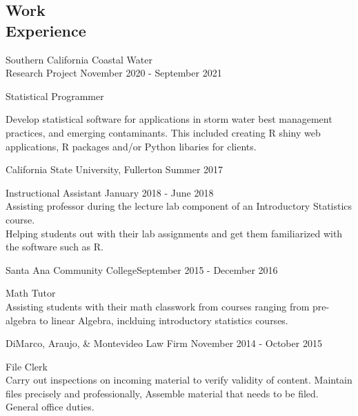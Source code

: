 \documentclass[margin,line]{res}
\newenvironment{list1}{
  \begin{list}{\ding{113}}{
      \setlength{\itemsep}{0in}
      \setlength{\parsep}{0in} \setlength{\parskip}{0in}
      \setlength{\topsep}{0in} \setlength{\partopsep}{0in} 
      \setlength{\leftmargin}{0.20in}}}{\end{list}}
\begin{document}
\begin{resume}
\vspace{2ex}


\section{\sc Work \\ Experience}
{\sc Southern California Coastal Water\\ Research Project} \hfill {November 2020 - September 2021}\\
\vspace*{-.12in}
\begin{list1}
\itemsep3pt
\item[] Statistical Programmer \\
\vskip -6pt

Develop statistical software for applications in storm water best management practices, and emerging contaminants. This included creating R shiny web applications, R packages and/or Python libaries for clients.
\end{list1}

{\sc California State University, Fullerton} \hfill {Summer 2017}\\
\vspace*{-.15in}
\begin{list1}
\item[] {\sc Instructional Assistant} \hfill{January 2018 - June 2018} \\
\vskip -6pt
Assisting professor during the lecture lab component of an Introductory Statistics course. \\
Helping students out with their lab assignments and get them familiarized with the software such as R. 

\end{list1}
{\sc Santa Ana Community College}\hfill {September 2015 - December 2016 }\\
\vspace*{-.15in}
\begin{list1}
\item[] {\sc Math Tutor}  \\
\vskip -6pt
Assisting students with their math classwork from courses ranging from pre-algebra to linear Algebra, inclduing introductory statistics courses.
\end{list1}

{\sc DiMarco, Araujo, \& Montevideo Law Firm} \hfill {November 2014 - October 2015}\\
\vspace*{-.15in}
\begin{list1}
\item[]{\sc File Clerk}\\
\vskip -6pt
Carry out inspections on incoming material to verify validity of content. Maintain files precisely and professionally, Assemble material that needs to be filed. General office duties.
\end{list1}


\end{resume}
\end{document}
